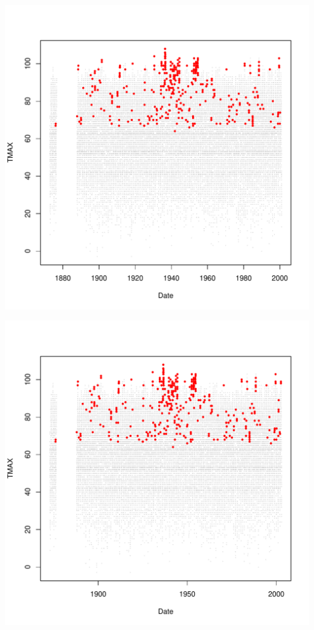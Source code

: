 \documentclass{article}\usepackage[]{graphicx}\usepackage[]{color}
\makeatletter
\def\maxwidth{ %
  \ifdim\Gin@nat@width>\linewidth
    \linewidth
  \else
    \Gin@nat@width
  \fi
}
\newenvironment{knitrout}{}{} %
\makeatother
\begin{document}
\begin{knitrout}
\includegraphics[width=\maxwidth]{figure/unnamed-chunk-4-60} 

\includegraphics[width=\maxwidth]{figure/unnamed-chunk-4-61} 


\end{knitrout}
\end{document}
